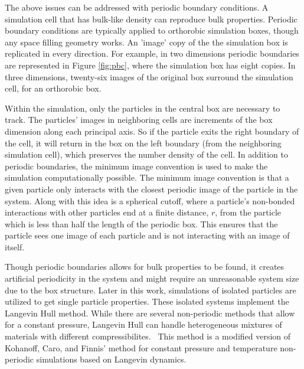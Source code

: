 The above issues can be addressed with periodic boundary conditions. A simulation cell that has bulk-like density can reproduce bulk properties. Periodic boundary conditions are typically applied to orthorobic simulation boxes, though any space filling geometry works. An 'image' copy of the the simulation box is replicated in every direction. For example, in two dimensions periodic boundaries are represented in Figure \ref{fig:pbc}, where the simulation box has eight copies. In three dimensions, twenty-six images of the original box surround the simulation cell, for an orthorobic box.
    
Within the simulation, only the particles in the central box are necessary to track. The particles' images in neighboring cells are increments of the box dimension along each principal axis. 
So if the particle exits the right boundary of the cell, it will return in the box on the left boundary (from the neighboring simulation cell), which preserves the number density of the cell. 
In addition to periodic boundaries, the minimum image convention is used to make the simulation computationally possible. The minimum image convention is that a given particle only interacts with the closest periodic image of the particle in the system. 
Along with this idea is a spherical cutoff, where a particle's non-bonded interactions with other particles end at a finite distance, $r$, from the particle which is less than half the length of the periodic box. This ensures that the particle sees one image of each particle and is not interacting with an image of itself. 

Though periodic boundaries allows for bulk properties to be found, it creates artificial periodicity in the system and might require an unreasonable system size due to the box structure. Later in this work, simulations of isolated particles are utilized to get single particle properties. 
These isolated systems implement the Langevin Hull method. While there are several non-periodic methods that allow for a constant pressure, Langevin Hull can handle heterogeneous mixtures of materials with different compressibilites.~\cite{Vardeman2011} This method is a modified version of Kohanoff, Caro, and Finnis' method for constant pressure and temperature non-periodic simulations based on Langevin dynamics.~\cite{Kohanoff:2005qm, Baltazar:2006ru} 

